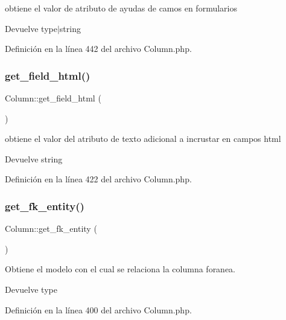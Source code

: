 obtiene el valor de atributo de ayudas de camos en formularios

\begin{DoxyReturn}{Devuelve}
type$\vert$string 
\end{DoxyReturn}


Definición en la línea 442 del archivo Column.\+php.

\mbox{\label{class_column_aac0bf1664721d84626a1fc9eca321488}} 
\subsubsection{\texorpdfstring{get\_field\_html()}{get\_field\_html()}}
{\footnotesize\ttfamily Column\+::get\+\_\+field\+\_\+html (\begin{DoxyParamCaption}{ }\end{DoxyParamCaption})}

obtiene el valor del atributo de texto adicional a incrustar en campos html

\begin{DoxyReturn}{Devuelve}
string 
\end{DoxyReturn}


Definición en la línea 422 del archivo Column.\+php.

\mbox{\label{class_column_ac8077334a5b99bee2ff2d63f211373cc}} 
\subsubsection{\texorpdfstring{get\_fk\_entity()}{get\_fk\_entity()}}
{\footnotesize\ttfamily Column\+::get\+\_\+fk\+\_\+entity (\begin{DoxyParamCaption}{ }\end{DoxyParamCaption})}

Obtiene el modelo con el cual se relaciona la columna foranea.

\begin{DoxyReturn}{Devuelve}
type 
\end{DoxyReturn}


Definición en la línea 400 del archivo Column.\+php.

\mbox{\label{class_column_a43e6f982df392a8497bce9869142e66c}} 
